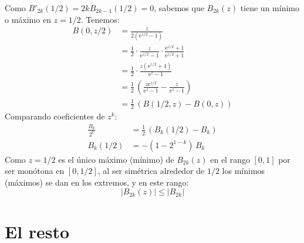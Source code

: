   Como \(B'_{2 k}(1 / 2) = 2 k B_{2 k - 1} (1 / 2) = 0\),
  sabemos que \(B_{2 k}(z)\)
  tiene un mínimo o máximo en \(z = 1 / 2\).
  Tenemos:
  \begin{align*}
    B(0, z / 2)
      &= \frac{z}{2 (\mathrm{e}^{z / 2} - 1)} \\
      &= \frac{1}{2} \cdot \frac{z}{\mathrm{e}^{z / 2} - 1}
	   \cdot \frac{\mathrm{e}^{z / 2} + 1}
		      {\mathrm{e}^{z / 2} + 1} \\
      &= \frac{1}{2}
	   \cdot \frac{z (\mathrm{e}^{z / 2} + 1)}
		      {\mathrm{e}^z - 1} \\
      &= \frac{1}{2} \,
	   \left(
	     \frac{z \mathrm{e}^{z / 2}}{\mathrm{e}^z - 1}
	       - \frac{z}{\mathrm{e}^z - 1}
	   \right) \\
      &= \frac{1}{2} \,
	   \left(B(1 / 2, z) - B(0, z) \right)
  \end{align*}
  Comparando coeficientes de \(z^k\):
  \begin{align*}
    \frac{B_k}{2^k}
      &= \frac{1}{2} \, \left( B_k(1 / 2) - B_k \right) \\
    B_k(1 / 2)
      &= - \left( 1 - 2^{1 - k} \right) \, B_k
  \end{align*}
  Como \(z = 1 / 2\) es el único máximo (mínimo) de \(B_{2 k} (z)\)
  en el rango \([0, 1]\) por ser monótona en \([0, 1 / 2]\),
  al ser simétrica alrededor de \(1 / 2\) los mínimos (máximos)
  se dan en los extremos,
  y en este rango:
  \begin{equation*}
    \lvert B_{2 k}(z) \rvert
      \le \lvert B_{2 k} \rvert
  \end{equation*}

\section{El resto}
\label{sec:resto-Euler-Maclaurin}

